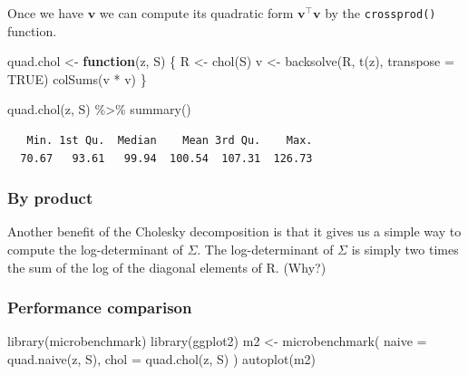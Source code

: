 \documentclass[
  letterpaper,
  DIV=11,
  numbers=noendperiod]{scrreprt}
\newenvironment{Shaded}{\begin{snugshade}}{\end{snugshade}}
\newcommand{\AttributeTok}[1]{\textcolor[rgb]{0.40,0.45,0.13}{#1}}
\newcommand{\ConstantTok}[1]{\textcolor[rgb]{0.56,0.35,0.01}{#1}}
\newcommand{\ControlFlowTok}[1]{\textcolor[rgb]{0.00,0.23,0.31}{\textbf{#1}}}
\newcommand{\FunctionTok}[1]{\textcolor[rgb]{0.28,0.35,0.67}{#1}}
\newcommand{\NormalTok}[1]{\textcolor[rgb]{0.00,0.23,0.31}{#1}}
\newcommand{\OtherTok}[1]{\textcolor[rgb]{0.00,0.23,0.31}{#1}}
\newcommand{\SpecialCharTok}[1]{\textcolor[rgb]{0.37,0.37,0.37}{#1}}
\begin{document}
Once we have \(\boldsymbol{v}\) we can compute its quadratic form
\(\boldsymbol{v}^\top \boldsymbol{v}\) by the \texttt{crossprod()}
function.

\begin{Shaded}
\begin{Highlighting}[]
\NormalTok{quad.chol }\OtherTok{\textless{}{-}} \ControlFlowTok{function}\NormalTok{(z, S) \{}
\NormalTok{  R }\OtherTok{\textless{}{-}} \FunctionTok{chol}\NormalTok{(S)}
\NormalTok{  v }\OtherTok{\textless{}{-}} \FunctionTok{backsolve}\NormalTok{(R, }\FunctionTok{t}\NormalTok{(z), }\AttributeTok{transpose =} \ConstantTok{TRUE}\NormalTok{)}
  \FunctionTok{colSums}\NormalTok{(v }\SpecialCharTok{*}\NormalTok{ v)}
\NormalTok{\}}

\FunctionTok{quad.chol}\NormalTok{(z, S) }\SpecialCharTok{\%\textgreater{}\%} \FunctionTok{summary}\NormalTok{()}
\end{Highlighting}
\end{Shaded}

\begin{verbatim}
   Min. 1st Qu.  Median    Mean 3rd Qu.    Max. 
  70.67   93.61   99.94  100.54  107.31  126.73 
\end{verbatim}

\subsubsection{By product}\label{by-product}

Another benefit of the Cholesky decomposition is that it gives us a
simple way to compute the log-determinant of \(\Sigma\). The
log-determinant of \(\Sigma\) is simply two times the sum of the log of
the diagonal elements of R. (Why?)

\subsubsection{Performance comparison}\label{performance-comparison}

\begin{Shaded}
\begin{Highlighting}[]
\FunctionTok{library}\NormalTok{(microbenchmark)}
\FunctionTok{library}\NormalTok{(ggplot2)}
\NormalTok{m2 }\OtherTok{\textless{}{-}} \FunctionTok{microbenchmark}\NormalTok{(}
  \AttributeTok{naive =} \FunctionTok{quad.naive}\NormalTok{(z, S),}
  \AttributeTok{chol  =} \FunctionTok{quad.chol}\NormalTok{(z, S)}
\NormalTok{)}
\FunctionTok{autoplot}\NormalTok{(m2)}
\end{Highlighting}
\end{Shaded}
\end{document}
